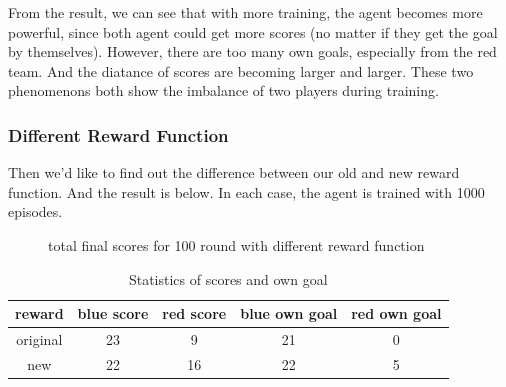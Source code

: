 \documentclass[12pt]{article}
\begin{document}
 From the result, we can see that with more training, the agent becomes more powerful, since both agent could get more scores (no matter if they get the goal by themselves). However, there are too many own goals, especially from the red team. And the diatance of scores are becoming larger and larger. These two phenomenons both show the imbalance of two players during training.

\subsubsection{Different Reward Function}
Then we'd like to find out the difference between our old and new reward function. And the result is below. In each case, the agent is trained with 1000 episodes.

\begin{figure}[htbp]
	\centering
	\caption{total final scores for 100 round with different reward function}
\end{figure}

\begin{table}[H]
	\begin{center}
		\begin{tabular}{|c|c|c|c|c|}
			\hline
			reward  & blue score & red score & blue own goal & red own goal \\ \hline
			original  & 23   & 9    & 21   & 0    \\ \hline
			new       & 22   & 16   & 22   & 5    \\ \hline
		\end{tabular}
		\caption{Statistics of scores and own goal}
	\end{center}
\end{table}
\end{document}
